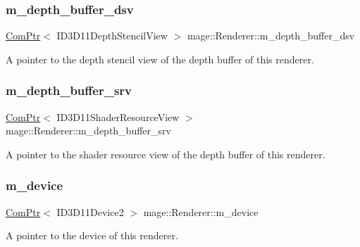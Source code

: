 \subsubsection{\texorpdfstring{m\+\_\+depth\+\_\+buffer\+\_\+dsv}{m\_depth\_buffer\_dsv}}
{\footnotesize\ttfamily \hyperlink{namespacemage_ae74f374780900893caa5555d1031fd79}{Com\+Ptr}$<$ I\+D3\+D11\+Depth\+Stencil\+View $>$ mage\+::\+Renderer\+::m\+\_\+depth\+\_\+buffer\+\_\+dsv\hspace{0.3cm}{\ttfamily [private]}}

A pointer to the depth stencil view of the depth buffer of this renderer. \hypertarget{classmage_1_1_renderer_ac5b85fc464bceb434748d8a44243788c}{}\label{classmage_1_1_renderer_ac5b85fc464bceb434748d8a44243788c} 
\subsubsection{\texorpdfstring{m\+\_\+depth\+\_\+buffer\+\_\+srv}{m\_depth\_buffer\_srv}}
{\footnotesize\ttfamily \hyperlink{namespacemage_ae74f374780900893caa5555d1031fd79}{Com\+Ptr}$<$ I\+D3\+D11\+Shader\+Resource\+View $>$ mage\+::\+Renderer\+::m\+\_\+depth\+\_\+buffer\+\_\+srv\hspace{0.3cm}{\ttfamily [private]}}

A pointer to the shader resource view of the depth buffer of this renderer. \hypertarget{classmage_1_1_renderer_aecf4bcb70dc186b4f2083df38d1e4bc3}{}\label{classmage_1_1_renderer_aecf4bcb70dc186b4f2083df38d1e4bc3} 
\subsubsection{\texorpdfstring{m\+\_\+device}{m\_device}}
{\footnotesize\ttfamily \hyperlink{namespacemage_ae74f374780900893caa5555d1031fd79}{Com\+Ptr}$<$ I\+D3\+D11\+Device2 $>$ mage\+::\+Renderer\+::m\+\_\+device\hspace{0.3cm}{\ttfamily [private]}}

A pointer to the device of this renderer. \hypertarget{classmage_1_1_renderer_a47c4a1d46e84bbdc3ec876809633877e}{}\label{classmage_1_1_renderer_a47c4a1d46e84bbdc3ec876809633877e} 

